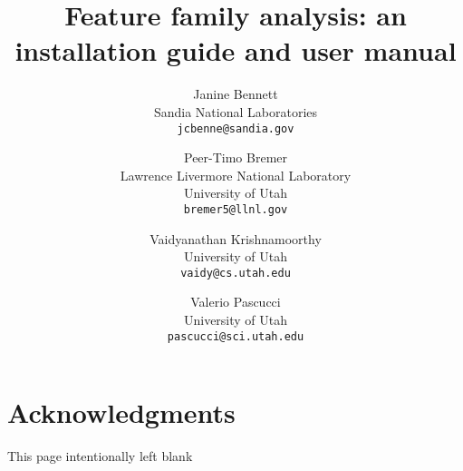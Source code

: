 \documentclass[ps2pdf,12pt,jpg]{SANDreport}
\title{Feature family analysis: an installation guide and user manual}
\author{Janine Bennett\\
        Sandia National Laboratories\\
        \texttt{jcbenne@sandia.gov}
	\and
        Peer-Timo Bremer\\
        Lawrence Livermore National Laboratory\\
        University of Utah\\
        \texttt{bremer5@llnl.gov}
	\and
	      Vaidyanathan Krishnamoorthy\\
        University of Utah\\
        \texttt{vaidy@cs.utah.edu}
	\and
	      Valerio Pascucci\\
        University of Utah\\
        \texttt{pascucci@sci.utah.edu}
}
\date{}
\begin{document}
\maketitle

\clearpage
\section*{Acknowledgments}
\clearpage
\tableofcontents
\newpage
\hfill
\vfill
\begin{center}
This page intentionally left blank
\end{center}
\vfill
\cleardoublepage
\def\arraystretch{2}
\SANDmain








\end{document}
